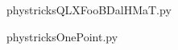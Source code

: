     

    \clearpage
    


    \newcommand{\CaptionFigQLXFooBDalHMaT}{<+Type your caption here+>}
    \begin{center}
        
    \end{center}
    phystricksQLXFooBDalHMaT.py

    

    \clearpage
    


    \newcommand{\CaptionFigOnePoint}{<+Type your caption here+>}
    \begin{center}
        
    \end{center}
    phystricksOnePoint.py

    

    \clearpage
    
